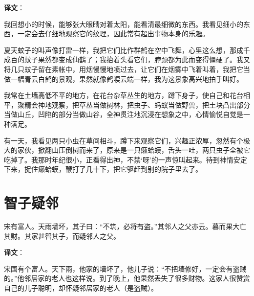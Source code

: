 \documentclass[12pt,UTF-8,openany,a4]{ctexbook}
\begin{document}
\newpage

\begin{Large}
   \noindent \textbf{译文}：
\end{Large}

\vspace{1em}

\begin{large}\yiwen
    
    我回想小的时候，能够张大眼睛对着太阳，能看清最细微的东西。我看见细小的东西，一定会去仔细地观察它的纹理，因此常有超出事物本身的乐趣。
    
    夏天蚊子的叫声像打雷一样，我把它们比作群鹤在空中飞舞，心里这么想，那成千成百的蚊子果然都变成仙鹤了；我抬着头看它们，脖颈都为此而变得僵硬了。我又将几只蚊子留在素帐中，用烟慢慢地喷过去，让它们在烟雾中飞着叫着，我把它当做一幅青云白鹤的景观，果然就像鹤唳云端一样，我为这景象高兴地拍手叫好。
    
    我常在土墙高低不平的地方，在花台杂草丛生的地方，蹲下身子，使自己和花台相平，聚精会神地观察，把草丛当做树林，把虫子、蚂蚁当做野兽，把土块凸出部分当做山丘，凹陷的部分当做山谷，全神贯注地沉浸在想象之中，心情愉悦自觉是一种满足。
    
    有一天，我看见两只小虫在草间相斗，蹲下来观察它们，兴趣正浓厚，忽然有个极大的家伙，掀翻山压倒树而来了，原来是一只癞蛤蟆，舌头一吐，两只虫子全被它吃掉了。我那时年纪很小，正看得出神，不禁‘呀’的一声惊叫起来。待到神情安定下来，捉住癞蛤蟆，鞭打了几十下，把它驱赶到别的院子里去了。
    

\end{large}



\chapter{智子疑邻}

\begin{large}
    
    宋有富人。天雨墙坏，其子曰：“不筑，必将有盗。”其邻人之父亦云。暮而果大亡其财。其家甚智其子，而疑邻人之父。

\end{large}


\newpage

\begin{Large}
   \noindent \textbf{译文}：
\end{Large}

\vspace{1em}

\begin{large}\yiwen
    
    宋国有个富人。天下雨，他家的墙坏了，他儿子说：“不把墙修好，一定会有盗贼的。”他邻居家的老人也这样说。到了晚上，他果然丢失了很多财物。这家人很赞赏自己的儿子聪明，却怀疑邻居家的老人（是盗贼）。
    

\end{large}
\end{document}
